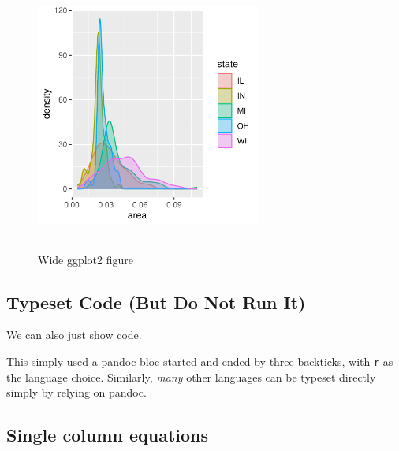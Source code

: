 \documentclass[letterpaper,9pt,twocolumn,twoside,]{pinp}
\begin{document}
\begin{figure}
  \begin{center}
    \includegraphics[width=0.66\textwidth, height=3.5in]{densities} 
  \end{center}
  \caption{Wide ggplot2 figure}\label{fig}
\end{figure}

\hypertarget{typeset-code-but-do-not-run-it}{%
\subsection{Typeset Code (But Do Not Run
It)}\label{typeset-code-but-do-not-run-it}}

We can also just show code.

\begin{Shaded}
\begin{Highlighting}[]
\OtherTok{\textless{}{-}}\NormalTok{ faithful[,}\NormalTok{]}
\OtherTok{\textless{}{-}} 
\end{Highlighting}
\end{Shaded}

This simply used a pandoc bloc started and ended by three backticks,
with \texttt{r} as the language choice. Similarly, \emph{many} other
languages can be typeset directly simply by relying on pandoc.

\hypertarget{single-column-equations}{%
\subsection{Single column equations}\label{single-column-equations}}
\end{document}
